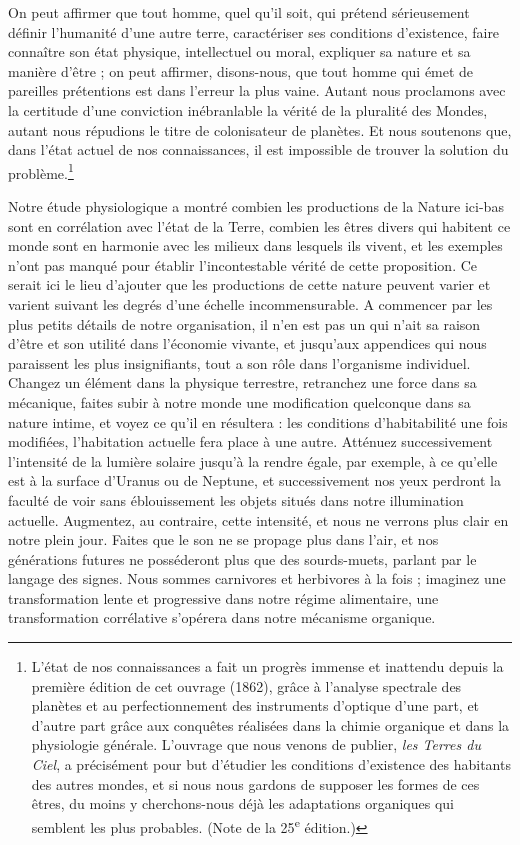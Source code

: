 \documentclass[a4paper, 11pt, oneside]{article}
\begin{document}
On peut affirmer que tout homme, quel qu'il soit, qui prétend sérieusement définir l'humanité d'une autre terre, caractériser ses conditions d'existence, faire connaître son état physique, intellectuel ou moral, expliquer sa nature et sa manière d'être ; on peut affirmer, disons-nous, que tout homme qui émet de pareilles prétentions est dans l'erreur la plus vaine. Autant nous proclamons avec la certitude d'une conviction inébranlable la vérité de la pluralité des Mondes, autant nous répudions le titre de colonisateur de planètes. Et nous soutenons que, dans l'état actuel de nos connaissances, il est impossible de trouver la solution du problème.\footnote{L'état de nos connaissances a fait un progrès immense et inattendu depuis la première édition de cet ouvrage (1862), grâce à l'analyse spectrale des planètes et au perfectionnement des instruments d'optique d'une part, et d'autre part grâce aux conquêtes réalisées dans la chimie organique et dans la physiologie générale. L'ouvrage que nous venons de publier, \emph{les Terres du Ciel}, a précisément pour but d'étudier les conditions d'existence des habitants des autres mondes, et si nous nous gardons de supposer les formes de ces êtres, du moins y cherchons-nous déjà les adaptations organiques qui semblent les plus probables. (Note de la 25\textsuperscript{e} édition.)}

Notre étude physiologique a montré combien les productions de la Nature ici-bas sont en corrélation avec l'état de la Terre, combien les êtres divers qui habitent ce monde sont en harmonie avec les milieux dans lesquels ils vivent, et les exemples n'ont pas manqué pour établir l'incontestable vérité de cette proposition. Ce serait ici le lieu d'ajouter que les productions de cette nature peuvent varier et varient suivant les degrés d'une échelle incommensurable. A commencer par les plus petits détails de notre organisation, il n'en est pas un qui n'ait sa raison d'être et son utilité dans l'économie vivante, et jusqu'aux appendices qui nous paraissent les plus insignifiants, tout a son rôle dans l'organisme individuel. Changez un élément dans la physique terrestre, retranchez une force dans sa mécanique, faites subir à notre monde une modification quelconque dans sa nature intime, et voyez ce qu'il en résultera : les conditions d'habitabilité une fois modifiées, l'habitation actuelle fera place à une autre. Atténuez successivement l'intensité de la lumière solaire jusqu'à la rendre égale, par exemple, à ce qu'elle est à la surface d'Uranus ou de Neptune, et successivement nos yeux perdront la faculté de voir sans éblouissement les objets situés dans notre illumination actuelle. Augmentez, au contraire, cette intensité, et nous ne verrons plus clair en notre plein jour. Faites que le son ne se propage plus dans l'air, et nos générations futures ne posséderont plus que des sourds-muets, parlant par le langage des signes. Nous sommes carnivores et herbivores à la fois ; imaginez une transformation lente et progressive dans notre régime alimentaire, une transformation corrélative s'opérera dans notre mécanisme organique.
\end{document}
